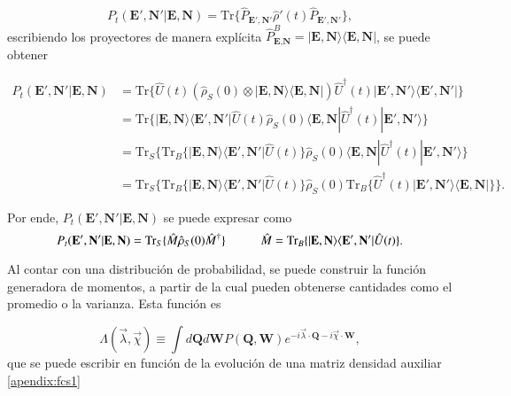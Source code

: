 \begin{equation*}
    P_{t}(\textbf{E}',\textbf{N}'|\textbf{E},\textbf{N}) = \text{Tr}\{\hat{P}_{\textbf{E}', \textbf{N}' }\hat{\rho}'(t) \hat{P}_{\textbf{E}', \textbf{N}' } \},
\end{equation*}
escribiendo los proyectores de manera explícita $\hat{P}^{B}_{\textbf{E}, \textbf{N} } = |\textbf{E}, \textbf{N} \rangle\langle \textbf{E}, \textbf{N}|$, se puede obtener 

\begin{align*} 
    P_{t}(\textbf{E}',\textbf{N}'|\textbf{E},\textbf{N}) & =  \text{Tr}\{\hat{U}(t)(\hat{\rho}_{S}(0)\otimes |\textbf{E}, \textbf{N}\rangle  \langle \textbf{E}, \textbf{N}| ) \hat{U}^{\dagger}(t)  |\textbf{E}', \textbf{N}'\rangle  \langle \textbf{E}', \textbf{N}'| \} \\
        & =  \text{Tr}\{|\textbf{E},\textbf{N} \rangle \langle \textbf{E}', \textbf{N}'| \hat{U}(t)\hat{\rho}_{S}(0) \langle \textbf{E}, \textbf{N}|\hat{U}^{\dagger}(t)|\textbf{E}', \textbf{N}'\rangle \}      \\ 
        & = \text{Tr}_{S}\{ \text{Tr}_{B}\{|\textbf{E},\textbf{N} \rangle \langle \textbf{E}', \textbf{N}'|\hat{U}(t) \}\hat{\rho}_{S}(0)\langle \textbf{E}, \textbf{N}|\hat{U}^{\dagger}(t)|\textbf{E}', \textbf{N}'\rangle      \} \\
        & = \text{Tr}_{S}\{ \text{Tr}_{B}\{|\textbf{E},\textbf{N}\rangle \langle \textbf{E}',\textbf{N}'|\hat{U}(t)  \} \hat{\rho}_{S}(0) \text{Tr}_{B}\{\hat{U}^{\dagger}(t) |\textbf{E}',\textbf{N}' \rangle \langle \textbf{E},\textbf{N}| \}     \}.
    \end{align*}    

Por ende, $P_{t}(\textbf{E}',\textbf{N}'|\textbf{E},\textbf{N})$ se puede expresar como
\begin{equation*}
    P_{t}(\textbf{E}',\textbf{N}'|\textbf{E},\textbf{N}) = \text{Tr}_{S}\{\hat{M} \hat{\rho}_{S}(0)\hat{M}^{\dagger} \}  \hspace{10mm} \hat{M} = \text{Tr}_{B}\{|\textbf{E},\textbf{N} \rangle \langle \textbf{E}',\textbf{N}' | \hat{U}(t)\}.
\end{equation*}

Al contar con una distribución de probabilidad, se puede construir la función generadora de momentos, a partir de la cual pueden obtenerse cantidades como el promedio o la varianza. Esta función es

\begin{equation}
    \Lambda(\vec{\lambda},\vec{\chi}) \equiv \int d\textbf{Q} d\textbf{W}P(\textbf{Q},\textbf{W}) e^{-i\vec{\lambda}\cdot \textbf{Q} -i\vec{\chi}\cdot \textbf{W} },
\label{sec2funciongeneradora}
\end{equation}
que se puede escribir en función de la evolución de una matriz densidad auxiliar \ref{apendix:fcs1}

